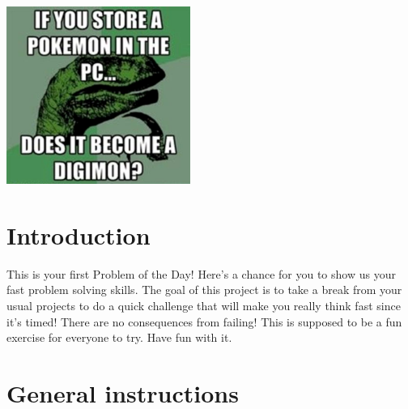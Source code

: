 \documentclass{42-en}
\begin{document}
    \begin{center}
        \includegraphics[width=0.45\textwidth]{meme.jpg}
    \end{center}

\chapter{Introduction}

    This is your first Problem of the Day! Here's a chance for you to show us 
    your fast problem solving skills. The goal of this project is to take a break
    from your usual projects to do a quick challenge that will make you really 
    think fast since it's timed! There are no consequences from failing! This is 
    supposed to be a fun exercise for everyone to try. Have fun with it. 

\chapter{General instructions}
\end{document}
